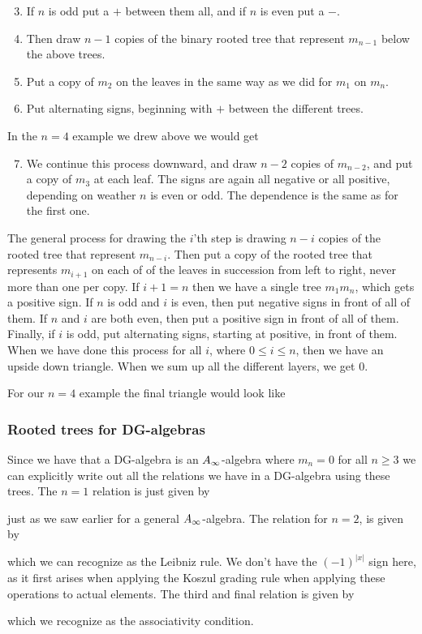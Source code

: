 

\begin{enumerate}
\setcounter{enumi}{2}
    \item If $n$ is odd put a $+$ between them all, and if $n$ is even put a $-$. 
    \item Then draw $n-1$ copies of the binary rooted tree that represent $m_{n-1}$ below the above trees. \item Put a copy of $m_2$ on the leaves in the same way as we did for $m_1$ on $m_n$.
    \item Put alternating signs, beginning with $+$ between the different trees.
\end{enumerate}

In the $n=4$ example we drew above we would get


\begin{enumerate}
\setcounter{enumi}{6}
    \item We continue this process downward, and draw $n-2$ copies of $m_{n-2}$, and put a copy of $m_3$ at each leaf. The signs are again all negative or all positive, depending on weather $n$ is even or odd. The dependence is the same as for the first one. 
\end{enumerate}

The general process for drawing the $i$'th step is drawing $n-i$ copies of the rooted tree that represent $m_{n-i}$. Then put a copy of the rooted tree that represents $m_{i+1}$ on each of of the leaves in succession from left to right, never more than one per copy. If $i+1=n$ then we have a single tree $m_1 m_{n}$, which gets a positive sign. If $n$ is odd and $i$ is even, then put negative signs in front of all of them. If $n$ and $i$ are both even, then put a positive sign in front of all of them. Finally, if $i$ is odd, put alternating signs, starting at positive, in front of them. When we have done this process for all $i$, where $0\leq i \leq n$, then we have an upside down triangle. When we sum up all the different layers, we get $0$. 

For our $n=4$ example the final triangle would look like



\subsubsection{Rooted trees for DG-algebras}

Since we have that a DG-algebra is an $A_{\infty}$-algebra where $m_n = 0$ for all $n\geq 3$ we can explicitly write out all the relations we have in a DG-algebra using these trees. The $n=1$ relation is just given by


just as we saw earlier for a general $A_{\infty}$-algebra. The relation for $n=2$, is given by


which we can recognize as the Leibniz rule. We don't have the $(-1)^{|x|}$ sign here, as it first arises when applying the Koszul grading rule when applying these operations to actual elements. The third and final relation is given by 


which we recognize as the associativity condition.